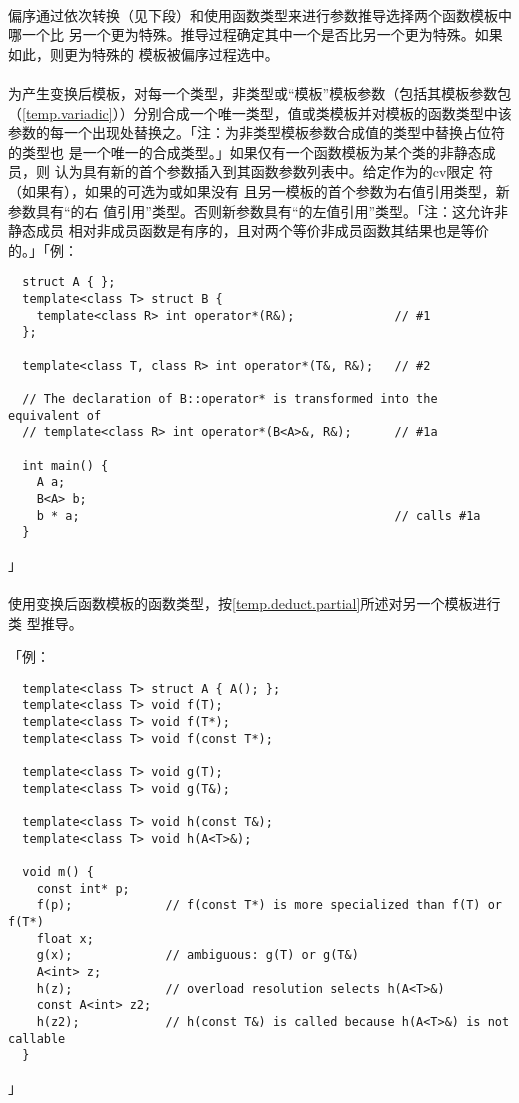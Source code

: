 \paragraph{}
偏序通过依次转换（见下段）和使用函数类型来进行参数推导选择两个函数模板中哪一个比
另一个更为特殊。推导过程确定其中一个是否比另一个更为特殊。如果如此，则更为特殊的
模板被偏序过程选中。

\paragraph{}
为产生变换后模板，对每一个类型，非类型或``模板''模板参数（包括其模板参数包
（\ref{temp.variadic}））分别合成一个唯一类型，值或类模板并对模板的函数类型中该
参数的每一个出现处替换之。「注：为非类型模板参数合成值的类型中替换占位符的类型也
是一个唯一的合成类型。」如果仅有一个函数模板为某个类的非静态成员，则
认为具有新的首个参数插入到其函数参数列表中。给定作为的cv限定
符（如果有），如果的可选为\tm{\&\&}或如果没有
且另一模板的首个参数为右值引用类型，新参数具有``的右
值引用''类型。否则新参数具有``的左值引用''类型。「注：这允许非静态成员
相对非成员函数是有序的，且对两个等价非成员函数其结果也是等价的。」「例：
\begin{lstlisting}
  struct A { };
  template<class T> struct B {
    template<class R> int operator*(R&);              // #1
  };

  template<class T, class R> int operator*(T&, R&);   // #2

  // The declaration of B::operator* is transformed into the equivalent of
  // template<class R> int operator*(B<A>&, R&);      // #1a

  int main() {
    A a;
    B<A> b;
    b * a;                                            // calls #1a
  }
\end{lstlisting}」

\paragraph{}
使用变换后函数模板的函数类型，按\ref{temp.deduct.partial}所述对另一个模板进行类
型推导。

「例：
\begin{lstlisting}
  template<class T> struct A { A(); };
  template<class T> void f(T);
  template<class T> void f(T*);
  template<class T> void f(const T*);

  template<class T> void g(T);
  template<class T> void g(T&);

  template<class T> void h(const T&);
  template<class T> void h(A<T>&);

  void m() {
    const int* p;
    f(p);             // f(const T*) is more specialized than f(T) or f(T*)
    float x;
    g(x);             // ambiguous: g(T) or g(T&)
    A<int> z;
    h(z);             // overload resolution selects h(A<T>&)
    const A<int> z2;
    h(z2);            // h(const T&) is called because h(A<T>&) is not callable
  }
\end{lstlisting}」

